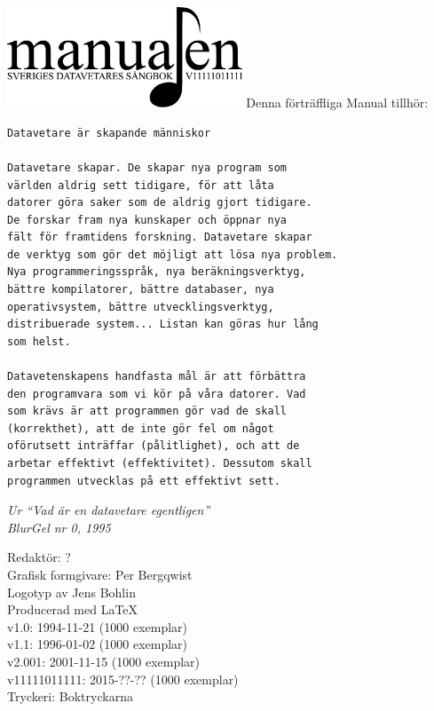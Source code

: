 \documentclass[a6paper,fontsize=10pt,twoside,open=right]{scrbook}
\begin{document}
\setlength{\parindent}{0pt}
\vspace*{6.5cm}
\hspace*{0.9cm}
\includegraphics[keepaspectratio,width=7cm]{elements/logo.pdf}
\clearpage
\noindent Denna förträffliga Manual tillhör:
\ohead{\textnormal{\textsc{\scriptsize\leftmark}}}
\ofoot[\pagemark]{\textsc{\scriptsize\pagemark}}
\clearpage
{\small\begin{verbatim}
Datavetare är skapande människor

Datavetare skapar. De skapar nya program som
världen aldrig sett tidigare, för att låta
datorer göra saker som de aldrig gjort tidigare.
De forskar fram nya kunskaper och öppnar nya
fält för framtidens forskning. Datavetare skapar
de verktyg som gör det möjligt att lösa nya problem.
Nya programmeringsspråk, nya beräkningsverktyg,
bättre kompilatorer, bättre databaser, nya
operativsystem, bättre utvecklingsverktyg,
distribuerade system... Listan kan göras hur lång
som helst.
  
Datavetenskapens handfasta mål är att förbättra
den programvara som vi kör på våra datorer. Vad
som krävs är att programmen gör vad de skall
(korrekthet), att de inte gör fel om något
oförutsett inträffar (pålitlighet), och att de
arbetar effektivt (effektivitet). Dessutom skall
programmen utvecklas på ett effektivt sett.
\end{verbatim}}
\vspace{10pt}
{\footnotesize\textit{Ur ``Vad är en datavetare
egentligen''\\ BlurGel nr 0, 1995}}
\clearpage
\setlength{\parindent}{15pt}
\null
\vfill
    {\noindent\small\centering
      Redaktör: ?\\
      Grafisk formgivare: Per Bergqwist\\
      Logotyp av Jens Bohlin\\
      Producerad med \LaTeX\\
      v1.0: 1994-11-21 (1000 exemplar)\\
      v1.1: 1996-01-02 (1000 exemplar)\\
      v2.001: 2001-11-15 (1000 exemplar)\\
      v11111011111: 2015-??-?? (1000 exemplar)\\
      Tryckeri: Boktryckarna\par
    }
\cleardoublepage
\end{document}
